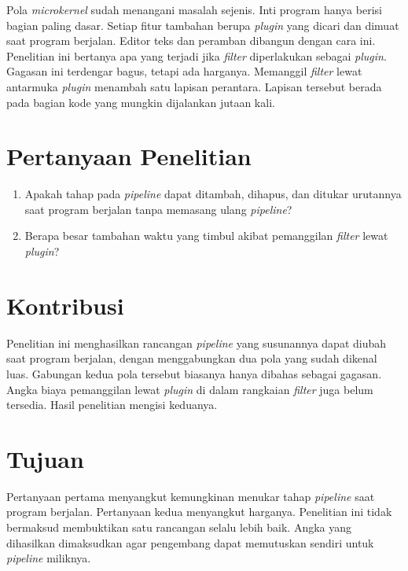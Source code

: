 \documentclass[11pt,a4paper]{article}
\begin{document}
Pola \textit{microkernel} sudah menangani masalah sejenis. Inti program hanya berisi bagian paling dasar. Setiap fitur tambahan berupa \textit{plugin} yang dicari dan dimuat saat program berjalan. Editor teks dan peramban dibangun dengan cara ini. Penelitian ini bertanya apa yang terjadi jika \textit{filter} diperlakukan sebagai \textit{plugin}. Gagasan ini terdengar bagus, tetapi ada harganya. Memanggil \textit{filter} lewat antarmuka \textit{plugin} menambah satu lapisan perantara. Lapisan tersebut berada pada bagian kode yang mungkin dijalankan jutaan kali.

\section{Pertanyaan Penelitian}

\begin{enumerate}[label=\textbf{Pertanyaan \arabic*.}, leftmargin=*, labelsep=0.5em]
  \item Apakah tahap pada \textit{pipeline} dapat ditambah, dihapus, dan ditukar urutannya saat program berjalan tanpa memasang ulang \textit{pipeline}?
  \item Berapa besar tambahan waktu yang timbul akibat pemanggilan \textit{filter} lewat \textit{plugin}?
\end{enumerate}

\section{Kontribusi}

Penelitian ini menghasilkan rancangan \textit{pipeline} yang susunannya dapat diubah saat program berjalan, dengan menggabungkan dua pola yang sudah dikenal luas. Gabungan kedua pola tersebut biasanya hanya dibahas sebagai gagasan. Angka biaya pemanggilan lewat \textit{plugin} di dalam rangkaian \textit{filter} juga belum tersedia. Hasil penelitian mengisi keduanya.

\section{Tujuan}

Pertanyaan pertama menyangkut kemungkinan menukar tahap \textit{pipeline} saat program berjalan. Pertanyaan kedua menyangkut harganya. Penelitian ini tidak bermaksud membuktikan satu rancangan selalu lebih baik. Angka yang dihasilkan dimaksudkan agar pengembang dapat memutuskan sendiri untuk \textit{pipeline} miliknya.
\end{document}
